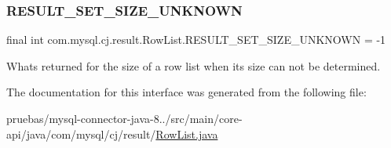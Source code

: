 \subsubsection{\texorpdfstring{R\+E\+S\+U\+L\+T\+\_\+\+S\+E\+T\+\_\+\+S\+I\+Z\+E\+\_\+\+U\+N\+K\+N\+O\+WN}{RESULT\_SET\_SIZE\_UNKNOWN}}
{\footnotesize\ttfamily final int com.\+mysql.\+cj.\+result.\+Row\+List.\+R\+E\+S\+U\+L\+T\+\_\+\+S\+E\+T\+\_\+\+S\+I\+Z\+E\+\_\+\+U\+N\+K\+N\+O\+WN = -\/1\hspace{0.3cm}{\ttfamily [static]}}

What\textquotesingle{}s returned for the size of a row list when its size can not be determined. 

The documentation for this interface was generated from the following file\+:\begin{DoxyCompactItemize}
\item 
pruebas/mysql-\/connector-\/java-\/8../src/main/core-\/api/java/com/mysql/cj/result/\mbox{\hyperlink{_row_list_8java}{Row\+List.\+java}}\end{DoxyCompactItemize}

